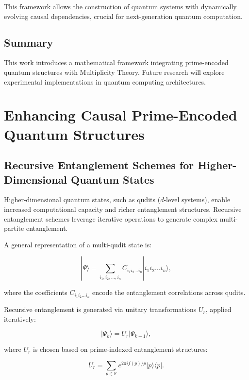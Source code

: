 \documentclass{article}
\theoremstyle{plain}
\begin{document}
\begin{itemize}
\begin{itemize}
This framework allows the construction of quantum systems with dynamically evolving causal dependencies, crucial for next-generation quantum computation.


\subsection{Summary}
This work introduces a mathematical framework integrating prime-encoded quantum structures with Multiplicity Theory. Future research will explore experimental implementations in quantum computing architectures.

\section{Enhancing Causal Prime-Encoded Quantum Structures}

\subsection{Recursive Entanglement Schemes for Higher-Dimensional Quantum States}

Higher-dimensional quantum states, such as qudits (\( d \)-level systems), enable increased computational capacity and richer entanglement structures. Recursive entanglement schemes leverage iterative operations to generate complex multi-partite entanglement.

A general representation of a multi-qudit state is:

\begin{equation}
|\Psi\rangle = \sum_{i_1, i_2, \dots, i_n} C_{i_1 i_2 \dots i_n} |i_1 i_2 \dots i_n\rangle,
\end{equation}

where the coefficients \( C_{i_1 i_2 \dots i_n} \) encode the entanglement correlations across qudits.

Recursive entanglement is generated via unitary transformations \( U_r \), applied iteratively:

\begin{equation}
|\Psi_k\rangle = U_r |\Psi_{k-1}\rangle,
\end{equation}

where \( U_r \) is chosen based on prime-indexed entanglement structures:

\begin{equation}
U_r = \sum_{p \in \mathbb{P}} e^{2\pi i f(p) / p} |p\rangle \langle p|.
\end{equation}


\end{itemize}
\end{itemize}
\end{document}
